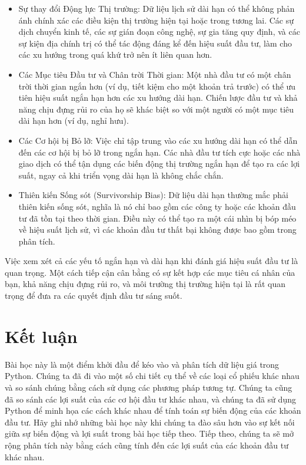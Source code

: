 \begin{itemize}
  \item Sự thay đổi Động lực Thị trường: Dữ liệu lịch sử dài hạn có thể không phản ánh chính xác các điều kiện thị trường hiện tại hoặc trong tương lai. Các sự dịch chuyển kinh tế, các sự gián đoạn công nghệ, sự gia tăng quy định, và các sự kiện địa chính trị có thể tác động đáng kể đến hiệu suất đầu tư, làm cho các xu hướng trong quá khứ trở nên ít liên quan hơn.
  \item Các Mục tiêu Đầu tư và Chân trời Thời gian: Một nhà đầu tư có một chân trời thời gian ngắn hơn (ví dụ, tiết kiệm cho một khoản trả trước) có thể ưu tiên hiệu suất ngắn hạn hơn các xu hướng dài hạn. Chiến lược đầu tư và khả năng chịu đựng rủi ro của họ sẽ khác biệt so với một người có một mục tiêu dài hạn hơn (ví dụ, nghỉ hưu).
  \item Các Cơ hội bị Bỏ lỡ: Việc chỉ tập trung vào các xu hướng dài hạn có thể dẫn đến các cơ hội bị bỏ lỡ trong ngắn hạn. Các nhà đầu tư tích cực hoặc các nhà giao dịch có thể tận dụng các biến động thị trường ngắn hạn để tạo ra các lợi suất, ngay cả khi triển vọng dài hạn là không chắc chắn.
  \item Thiên kiến Sống sót (Survivorship Bias): Dữ liệu dài hạn thường mắc phải thiên kiến sống sót, nghĩa là nó chỉ bao gồm các công ty hoặc các khoản đầu tư đã tồn tại theo thời gian. Điều này có thể tạo ra một cái nhìn bị bóp méo về hiệu suất lịch sử, vì các khoản đầu tư thất bại không được bao gồm trong phân tích.
\end{itemize}
Việc xem xét cả các yếu tố ngắn hạn và dài hạn khi đánh giá hiệu suất đầu tư là quan trọng. Một cách tiếp cận cân bằng có sự kết hợp các mục tiêu cá nhân của bạn, khả năng chịu đựng rủi ro, và môi trường thị trường hiện tại là rất quan trọng để đưa ra các quyết định đầu tư sáng suốt.

\section{Kết luận}

Bài học này là một điểm khởi đầu để kéo vào và phân tích dữ liệu giá trong Python. Chúng ta đã đi vào một số chi tiết cụ thể về các loại cổ phiếu khác nhau và so sánh chúng bằng cách sử dụng các phương pháp tương tự. Chúng ta cũng đã so sánh các lợi suất của các cơ hội đầu tư khác nhau, và chúng ta đã sử dụng Python để minh họa các cách khác nhau để tính toán sự biến động của các khoản đầu tư. Hãy ghi nhớ những bài học này khi chúng ta đào sâu hơn vào sự kết nối giữa sự biến động và lợi suất trong bài học tiếp theo. Tiếp theo, chúng ta sẽ mở rộng phân tích này bằng cách cũng tính đến các lợi suất của các khoản đầu tư khác nhau.

